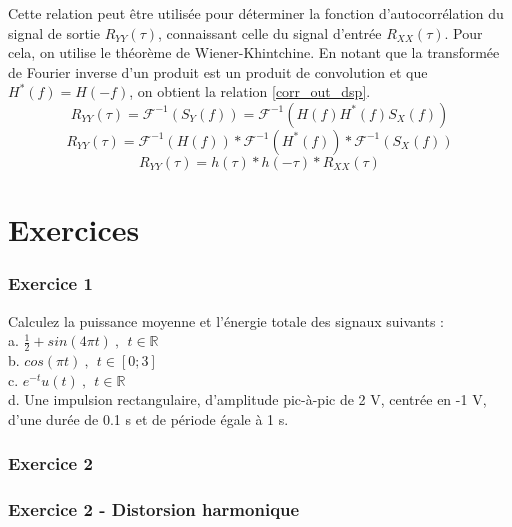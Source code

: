 	Cette relation peut être utilisée pour déterminer la fonction d'autocorrélation du signal de sortie $R_{YY}(\tau)$, connaissant celle du signal d'entrée $R_{XX}(\tau)$. Pour cela, on utilise le théorème de Wiener-Khintchine. En notant que la transformée de Fourier inverse d'un produit est un produit de convolution et que $H^{*}(f)=H(-f)$, on obtient la relation \ref{corr_out_dsp}.  
	\begin{equation*}
	R_{YY}(\tau)=\mathcal{F}^{-1}(S_{Y}(f))=\mathcal{F}^{-1}(H(f)H^{*}(f)S_{X}(f))
	\end{equation*}
	\begin{equation*}
	R_{YY}(\tau)=\mathcal{F}^{-1}(H(f))*\mathcal{F}^{-1}(H^{*}(f))*\mathcal{F}^{-1}(S_{X}(f))
	\end{equation*}
	\begin{equation}\label{corr_out_dsp}
	R_{YY}(\tau)=h(\tau)*h(-\tau)*R_{XX}(\tau)
	\end{equation}
	
	\vspace{1\baselineskip}
	
	\section{Exercices}
	
	\subsubsection{Exercice 1}
	
	Calculez la puissance moyenne et l'énergie totale des signaux suivants :\\
	
	a. $\frac{1}{2}+sin(4\pi t)~,~~t \in \mathbb{R}$\\
	
	b. $cos(\pi t)~,~~t \in [0;3]$\\
	
	c. $e^{-t}u(t)~,~~t \in \mathbb{R}$\\
	
	d. Une impulsion rectangulaire, d'amplitude pic-à-pic de 2 V, centrée en -1 V, d'une durée de 0.1 s et de période égale à 1 s.\\
	
	
	\subsubsection{Exercice 2}
	
	\subsubsection{Exercice 2 - Distorsion harmonique}
	

